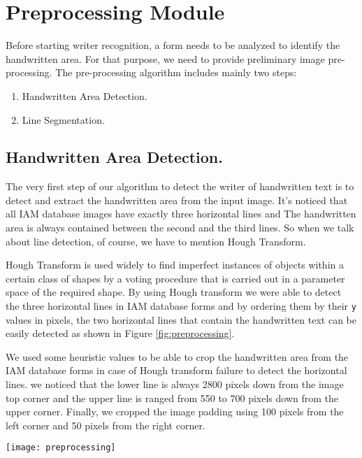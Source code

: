 \section{Preprocessing Module}
Before starting writer recognition, a form needs to be analyzed to identify the handwritten area. For that purpose, we need to provide preliminary image pre-processing. The pre-processing algorithm includes mainly two steps:
\begin{enumerate}
  \item Handwritten Area Detection.
  \item Line Segmentation.
\end{enumerate}

\subsection{Handwritten Area Detection.}
The very first step of our algorithm to detect the writer of handwritten text is to detect and extract the handwritten area from the input image. It's noticed that all IAM database images have exactly three horizontal lines and The handwritten area is always contained between the second and the third lines. So when we talk about line detection, of course, we have to mention Hough Transform. 

Hough Transform is used widely to find imperfect instances of objects within a certain class of shapes by a voting procedure that is carried out in a parameter space of the required shape. By using Hough transform we were able to detect the three horizontal lines in IAM database forms and by ordering them by their \texttt{y} values in pixels, the two horizontal lines that contain the handwritten text can be easily detected as shown in Figure \ref{fig:preprocessing}. 

We used some heuristic values to be able to crop the handwritten area from the IAM database forms in case of Hough transform failure to detect the horizontal lines. we noticed that the lower line is always 2800 pixels down from the image top corner and the upper line is ranged from 550 to 700 pixels down from the upper corner. Finally, we cropped the image padding using 100 pixels from the left corner and 50 pixels from the right corner.

\begin{figure*}[h]
    \centering
    \texttt{[image: preprocessing]}
    \label{fig:preprocessing}
\end{figure*}

